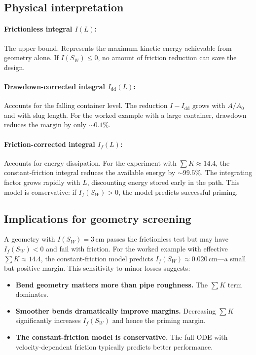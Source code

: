 \documentclass[11pt]{article}
\begin{document}
\subsection{Physical interpretation}

\paragraph{Frictionless integral $I(L)$:} The upper bound. Represents the maximum kinetic energy achievable from geometry alone. If $I(S_W) \leq 0$, no amount of friction reduction can save the design.

\paragraph{Drawdown-corrected integral $I_{\text{dd}}(L)$:} Accounts for the falling container level. The reduction $I - I_{\text{dd}}$ grows with $A/A_0$ and with slug length. For the worked example with a large container, drawdown reduces the margin by only $\sim 0.1\%$.

\paragraph{Friction-corrected integral $I_f(L)$:} Accounts for energy dissipation. For the experiment with $\sum K \approx 14.4$, the constant-friction integral reduces the available energy by $\sim 99.5\%$. The integrating factor grows rapidly with $L$, discounting energy stored early in the path. This model is conservative: if $I_f(S_W) > 0$, the model predicts successful priming.

\subsection{Implications for geometry screening}

A geometry with $I(S_W) = 3$\,cm passes the frictionless test but may have $I_f(S_W) < 0$ and fail with friction. For the worked example with effective $\sum K \approx 14.4$, the constant-friction model predicts $I_f(S_W) \approx 0.020$\,cm---a small but positive margin. This sensitivity to minor losses suggests:
\begin{itemize}[nosep,leftmargin=2em]
  \item \textbf{Bend geometry matters more than pipe roughness.} The $\sum K$ term dominates.
  \item \textbf{Smoother bends dramatically improve margins.} Decreasing $\sum K$ significantly increases $I_f(S_W)$ and hence the priming margin.
  \item \textbf{The constant-friction model is conservative.} The full ODE with velocity-dependent friction typically predicts better performance.
\end{itemize}
\end{document}
